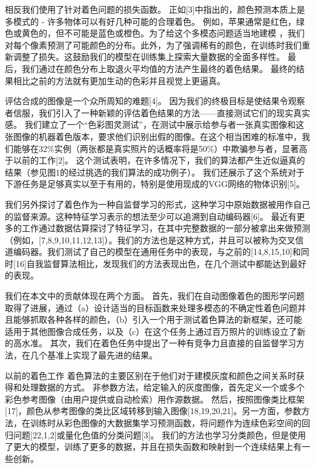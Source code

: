 相反我们使用了针对着色问题的损失函数。 正如[3]中指出的，颜色预测本质上是多模式的 - 许多物体可以有好几种可能的合理着色。 例如，苹果通常是红色，绿色或黄色的，但不可能是蓝色或橙色。为了给这个多模态问题适当地建模 ，我们对每个像素预测了可能颜色的分布。此外，为了强调稀有的颜色，在训练时我们重新调整了损失。这鼓励我们的模型在训练集上探索大量数据的全面多样性。 最后，我们通过在颜色分布上取退火平均值的方法产生最终的着色结果。 最终的结果相比之前的方法就有更加生动的色彩并且视觉上更逼真。

评估合成的图像是一个众所周知的难题[4]。 因为我们的终极目标是使结果令观察者信服，我们引入了一种新颖的评估着色结果的方法——直接测试它们的现实真实感。 我们建立了一个“色彩图灵测试”，在测试中展示给参与者一张真实图像和这张图像的机器着色版本，要求他们识别出假的图像。在这个相当困难的标准中，我们能够在32\%实例（两张都是真实照片的话概率将是50\%）中欺骗参与者，显著高于以前的工作[2]。 这个测试表明，在许多情况下，我们的算法都产生近似逼真的结果（参见图1的经过挑选的我们算法的成功例子）。 我们还展示了这个系统对于下游任务是足够真实以至于有用的，特别是使用现成的VGG网络的物体识别[5]。

我们另外探讨了着色作为一种自监督学习的形式，这种学习中原始数据被用作自己的监督来源。这种特征学习表示的想法至少可以追溯到自动编码器[6]。 最近有更多的工作通过数据估算探讨了特征学习，在其中完整数据的一部分被拿出来做预测（例如，[7,8,9,10,11,12,13]）。我们的方法也是这种方式，并且可以被称为交叉信道编码器。我们测试了自己的模型在通用任务中的表现，与之前的[14,8,15,10]和同时[16]自我监督算法相比，发现我们的方法表现出色，在几个测试中都能达到最好的表现。

我们在本文中的贡献体现在两个方面。 首先，我们在自动图像着色的图形学问题取得了进展，通过（a）设计适当的目标函数来处理多模态的不确定性着色问题并且能够抓取各种各样的颜色，（b）引入一个用于测试着色算法的新框架，还可能适用于其他图像合成任务，以及（c）在这个任务上通过百万照片的训练设立了新的高水准。 其次，我们在着色任务中提出了一种有竞争力且直接的自监督学习方法，在几个基准上实现了最先进的结果。

$\textbf{以前的着色工作}$ 着色算法的主要区别在于他们对于建模灰度和颜色之间关系时获得和处理数据的方式。 非参数方法，给定输入的灰度图像，首先定义一个或多个彩色参考图像（由用户提供或自动检索）用作源数据。 然后，按照图像类比框架[17]，颜色从参考图像的类比区域转移到输入图像[18,19,20,21]。另一方面，参数方法，在训练时从彩色图像的大数据集学习预测函数，将问题作为连续色彩空间的回归问题[22,1,2]或量化色值的分类问题[3]。 我们的方法也学习分类颜色，但是使用了更大的模型，训练了更多的数据，并且在损失函数和映射到一个连续结果上有一些创新。

